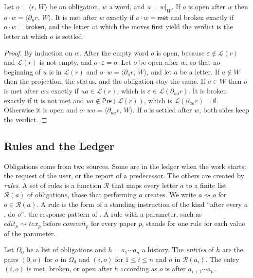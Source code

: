\documentclass[acmsmall,nonacm,screen]{acmart}
\newcommand{\kw}[1]{\mathsf{#1}}
\newcommand{\nm}[1]{\mathit{#1}}
\newcommand{\ob}[2]{\langle #1,\, #2 \rangle}
\newcommand{\lang}[1]{\mathcal{L}(#1)}
\newcommand{\pre}[1]{\kw{Pre}(#1)}
\newcommand{\rules}{\mathcal{R}}
\newcommand{\met}{\kw{met}}
\newcommand{\brk}{\kw{broken}}
\newcommand{\bef}{\mathrel{\text{before}}}
\newcommand{\dv}[2]{\partial_{#1}#2}
\newcommand{\proj}[2]{#1|_{#2}}
\newcommand{\creates}{\rightsquigarrow}
\newcommand{\edit}{\nm{edit}}
\newcommand{\tex}{\nm{tex}}
\newcommand{\commit}{\nm{commit}}
\begin{document}
\begin{lemma}
\label{lem:step}
Let $o = \ob{r}{W}$ be an obligation, $w$ a word, and $u = \proj{w}{W}$. If $o$ is open after
$w$ then $o \cdot w = \ob{\dv{u}{r}}{W}$. It is met after $w$ exactly if $o \cdot w = \met$
and broken exactly if $o \cdot w = \brk$, and the letter at which the moves first yield the
verdict is the letter at which $o$ is settled.
\end{lemma}

\begin{proof}
By induction on $w$. After the empty word $o$ is open, because $\varepsilon \notin
\lang{r}$ and $\lang{r}$ is not empty, and $o \cdot \varepsilon = o$. Let $o$ be open after
$w$, so that no beginning of $u$ is in $\lang{r}$ and $o \cdot w = \ob{\dv{u}{r}}{W}$, and
let $a$ be a letter. If $a \notin W$ then the projection, the status, and the obligation
stay the same. If $a \in W$ then $o$ is met after $wa$ exactly if $ua \in \lang{r}$, which
is $\varepsilon \in \lang{\dv{ua}{r}}$. It is broken exactly if it is not met and
$ua \notin \pre{\lang{r}}$, which is $\lang{\dv{ua}{r}} = \emptyset$. Otherwise it is open
and $o \cdot wa = \ob{\dv{ua}{r}}{W}$. If $o$ is settled after $w$, both sides keep the
verdict.
\end{proof}

\subsection{Rules and the Ledger}

Obligations come from two sources. Some are in the ledger when the work starts: the request
of the user, or the report of a predecessor. The others are created by \emph{rules}. A set
of rules is a function $\rules$ that maps every letter $a$ to a finite list $\rules(a)$ of
obligations, those that performing $a$ creates. We write $a \creates o$ for
$o \in \rules(a)$. A rule is the form of a standing instruction of the kind ``after every
$a$, do $o$'', the response pattern of \citet{dwyer1999}. A rule with a parameter, such as
$\edit_p \creates \tex_p \bef \commit_p$ for every paper $p$, stands for one rule for each
value of the parameter.

\begin{definition}[Entries]
\label{def:entries}
Let $\Omega_0$ be a list of obligations and $h = a_1 \cdots a_n$ a history. The
\emph{entries} of $h$ are the pairs $(0, o)$ for $o$ in $\Omega_0$ and $(i, o)$ for
$1 \le i \le n$ and $o$ in $\rules(a_i)$. The entry $(i, o)$ is met, broken, or open after
$h$ according as $o$ is after $a_{i+1} \cdots a_n$.
\end{definition}
\end{document}

